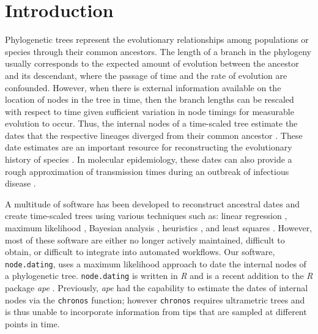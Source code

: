 \documentclass{bioinfo}
\newcommand{\code}[1]{{\tt #1}}
\begin{document}
\section{Introduction} \label{sec:intro}
Phylogenetic trees represent the evolutionary relationships among populations or species through their common ancestors.  
The length of a branch in the phylogeny usually corresponds to the expected amount of evolution between the ancestor and its descendant, where the passage of time and the rate of evolution are confounded.
However, when there is external information available on the location of nodes in the tree in time, then the branch lengths can be rescaled with respect to time given sufficient variation in node timings for measurable evolution to occur.
Thus, the internal nodes of a time-scaled tree estimate the dates that the respective lineages diverged from their common ancestor \citep{Kumar16}.
These date estimates are an important resource for reconstructing the evolutionary history of species \citep{Shapiro04}.
In molecular epidemiology, these dates can also provide a rough approximation of transmission times during an outbreak of infectious disease 
\citep{Ypma13}.

A multitude of software has been developed to reconstruct ancestral dates and create time-scaled trees using various techniques such as: linear regression \citep{Tempest}, maximum likelihood \citep{TipDates, r8ts, PAML}, Bayesian analysis \citep{BEAST}, heuristics \citep{UPGMA, TREBLE}, and least squares \citep{LSD}.
However, most of these software are either no longer actively maintained, difficult to obtain, or difficult to integrate into automated workflows.
Our software, \code{node.dating}, uses a maximum likelihood approach to date the internal nodes of a phylogenetic tree.
\code{node.dating} is written in \emph{R} and is a recent addition to the \emph{R} package \emph{ape} \citep{APE}.
Previously, \emph{ape} had the capability to estimate the dates of internal nodes via the \code{chronos} function; however \code{chronos} requires ultrametric trees and is thus unable to incorporate information from tips that are sampled at different points in time.
\end{document}
